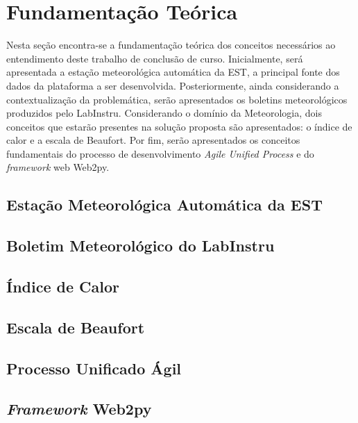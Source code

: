\chapter{Fundamentação Teórica}

Nesta seção encontra-se a fundamentação teórica dos conceitos necessários ao entendimento deste trabalho de conclusão de curso. Inicialmente, será apresentada a estação meteorológica automática da EST, a principal fonte dos dados da plataforma a ser desenvolvida. Posteriormente, ainda considerando a contextualização da problemática, serão apresentados os boletins meteorológicos produzidos pelo LabInstru. Considerando o domínio da Meteorologia, dois conceitos que estarão presentes na solução proposta são apresentados: o índice de calor e a escala de Beaufort. Por fim, serão apresentados os conceitos fundamentais do processo de desenvolvimento \emph{Agile Unified Process} e do \emph{framework} web Web2py.

\section{Estação Meteorológica Automática da EST}


\section{Boletim Meteorológico do LabInstru} \label{sec:boletim}


\section{Índice de Calor}


\section{Escala de Beaufort}


\section{Processo Unificado Ágil}


\section{\emph{Framework} Web2py} \label{sec:web2py}
